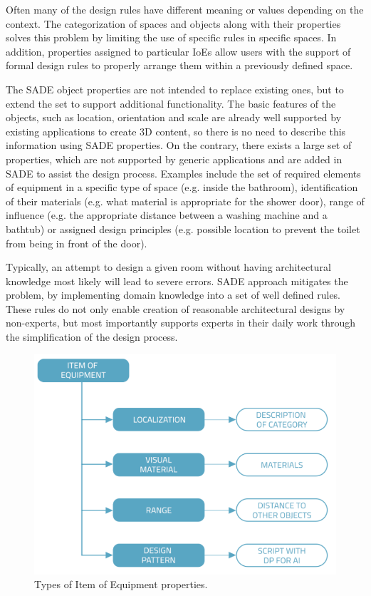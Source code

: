 \documentclass[runningheads]{llncs}
\begin{document}
Often many of the design rules have different meaning or values depending on the context. 
The categorization of spaces and objects along with their properties solves this problem by limiting the use of specific rules in specific spaces. In addition, properties assigned to particular IoEs allow users with the support of formal design rules to properly arrange them within a previously defined space.

The SADE object properties are not intended to replace existing ones, but to extend the set to support additional functionality. The basic features of the objects, such as location, orientation and scale are already well supported by existing applications to create 3D content, so there is no need to describe this information using SADE properties. On the contrary, there exists a large set of properties, which are not supported by generic applications and are added in SADE to assist the design process. Examples include the set of required elements of equipment in a specific type of space (e.g. inside the bathroom), identification of their materials (e.g. what material is appropriate for the shower door), range of influence (e.g. the appropriate distance between a washing machine and a bathtub) or assigned design principles (e.g. possible location to prevent the toilet from being in front of the door).

Typically, an attempt to design a given room without having architectural knowledge most likely will lead to severe errors. SADE approach mitigates the problem, by implementing domain knowledge into a set of well defined rules. These rules do not only enable creation of reasonable architectural designs by non-experts, but most importantly supports experts in their daily work through the simplification of the design process. 

\begin{figure}[H]
\centering
\includegraphics[width=\textwidth]{graf.png}
\caption{Types of Item of Equipment properties.} \label{fig1}
\end{figure}
\end{document}
